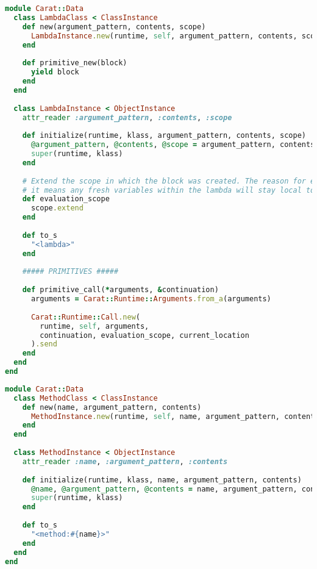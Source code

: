 \begin{lstlisting}[title={\small\Helvetica data/lambda.rb},language=Ruby]
module Carat::Data
  class LambdaClass < ClassInstance
    def new(argument_pattern, contents, scope)
      LambdaInstance.new(runtime, self, argument_pattern, contents, scope)
    end
    
    def primitive_new(block)
      yield block
    end
  end
  
  class LambdaInstance < ObjectInstance
    attr_reader :argument_pattern, :contents, :scope
    
    def initialize(runtime, klass, argument_pattern, contents, scope)
      @argument_pattern, @contents, @scope = argument_pattern, contents, scope
      super(runtime, klass)
    end
    
    # Extend the scope in which the block was created. The reason for extending the scope is that 
    # it means any fresh variables within the lambda will stay local to the lambda.
    def evaluation_scope
      scope.extend
    end
    
    def to_s
      "<lambda>"
    end
    
    ##### PRIMITIVES #####
    
    def primitive_call(*arguments, &continuation)
      arguments = Carat::Runtime::Arguments.from_a(arguments)
      
      Carat::Runtime::Call.new(
        runtime, self, arguments,
        continuation, evaluation_scope, current_location
      ).send
    end
  end
end

\end{lstlisting}
\begin{lstlisting}[title={\small\Helvetica data/method.rb},language=Ruby]
module Carat::Data
  class MethodClass < ClassInstance
    def new(name, argument_pattern, contents)
      MethodInstance.new(runtime, self, name, argument_pattern, contents)
    end
  end
  
  class MethodInstance < ObjectInstance
    attr_reader :name, :argument_pattern, :contents
    
    def initialize(runtime, klass, name, argument_pattern, contents)
      @name, @argument_pattern, @contents = name, argument_pattern, contents
      super(runtime, klass)
    end
    
    def to_s
      "<method:#{name}>"
    end
  end
end

\end{lstlisting}
